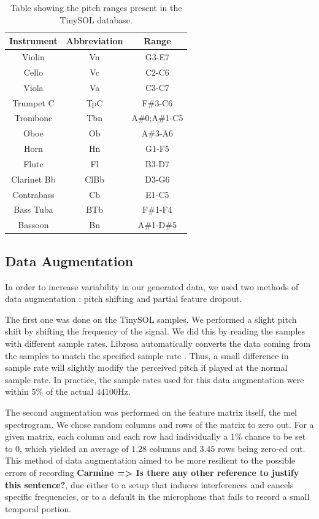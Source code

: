 \documentclass{article}
\newcommand{\carmine}[1]{\textbf{\color{red} Carmine => #1}}
\begin{document}
\begin{table}
\begin{tabular}{|c|c|c|}
\hline
Instrument & Abbreviation & Range \\
\hline
Violin & Vn & G3-E7\\
Cello & Vc & C2-C6\\
Viola & Va & C3-C7\\
Trumpet C & TpC & F\#3-C6\\
Trombone & Tbn & A\#0;A\#1-C5\\
Oboe & Ob & A\#3-A6\\
Horn & Hn & G1-F5\\
Flute & Fl & B3-D7\\
Clarinet Bb & ClBb & D3-G6\\
Contrabass & Cb & E1-C5\\
Bass Tuba & BTb & F\#1-F4\\
Bassoon & Bn & A\#1-D\#5\\
\hline
\end{tabular}
\caption{Table showing the pitch ranges present in the TinySOL database.\label{tinysol}}
\end{table}

\subsection{Data Augmentation}

In order to increase variability in our generated data, we used two methods of data augmentation \cite{Salamon17}\cite{Bhardwaj17} : pitch shifting and partial feature dropout.

The first one was done on the TinySOL samples. We performed a slight pitch shift by shifting the frequency of the signal. We did this by reading the samples with different sample rates. Librosa automatically converts the data coming from the samples to match the specified sample rate \cite{mcfee15}. Thus, a small difference in sample rate will slightly modify the perceived pitch if played at the normal sample rate. In practice, the sample rates used for this data augmentation were within $5\%$ of the actual $44100$Hz.

The second augmentation was performed on the feature matrix itself, the mel spectrogram. We chose random columns and rows of the matrix to zero out. For a given matrix, each column and each row had individually a $1\%$ chance to be set to 0, which yielded an average of $1.28$  columns and $3.45$ rows being zero-ed out. This method of data augmentation aimed to be more resilient to the possible errors of recording \carmine{Is there any other reference to justify this sentence?}, due either to a setup that induces interferences and cancels specific frequencies, or to a default in the microphone that fails to record a small temporal portion.
\end{document}

